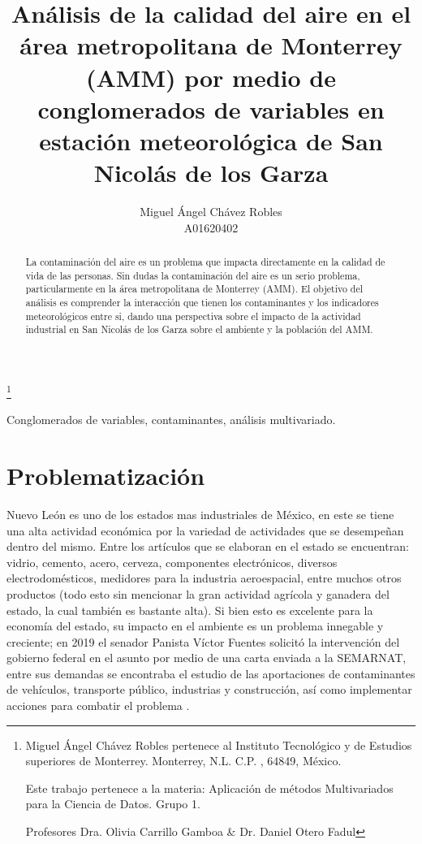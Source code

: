 \documentclass[journal, 10pt]{IEEEtran}                                                          %
\title{Análisis de la calidad del  aire  en  el área metropolitana  de Monterrey (AMM) por medio de conglomerados de variables en estación meteorológica de San Nicolás de los Garza}
\author{Miguel Ángel Chávez Robles \\A01620402}
\begin{document}
\thanks{Miguel Ángel Chávez Robles pertenece al Instituto Tecnológico y de Estudios superiores de Monterrey. Monterrey, N.L. C.P. , 64849, México. 

Este trabajo pertenece a la materia: Aplicación de métodos Multivariados para la Ciencia de Datos. Grupo 1. 

Profesores Dra. Olivia Carrillo Gamboa \& Dr. Daniel Otero Fadul {\tt\small}}


\maketitle

\thispagestyle{empty}
\pagestyle{empty}

\begin{abstract}
La contaminación del aire es un problema que impacta directamente en la calidad de vida de las personas. Sin dudas la contaminación del aire es un serio problema, particularmente en la área metropolitana de Monterrey (AMM). El objetivo del análisis es comprender la interacción que tienen los contaminantes y los indicadores meteorológicos entre si, dando una perspectiva sobre el impacto de la actividad industrial en San Nicolás de los Garza sobre el ambiente y la población del AMM.

\end{abstract}

\begin{IEEEkeywords} 
Conglomerados de variables, contaminantes, análisis multivariado.
\end{IEEEkeywords}

\section{Problematización} \label{problematización}

Nuevo León es uno de los estados mas industriales de México, en este se tiene una alta actividad económica por la variedad de actividades que se desempeñan dentro del mismo. Entre los artículos que se elaboran en el estado se encuentran: vidrio, cemento, acero, cerveza, componentes electrónicos, diversos electrodomésticos, medidores para la industria aeroespacial, entre muchos otros productos \cite{NL} (todo esto sin mencionar la gran actividad agrícola y ganadera del estado, la cual también es bastante alta). Si bien esto es excelente para la economía del estado, su impacto en el ambiente es un problema innegable y creciente; en 2019 el senador Panista Víctor Fuentes solicitó la intervención del gobierno federal en el asunto por medio de una carta enviada a la SEMARNAT, entre sus demandas se encontraba el estudio de las aportaciones de contaminantes de vehículos, transporte público, industrias y construcción, así como implementar acciones para combatir el problema \cite{semarnat}.
\end{document}

